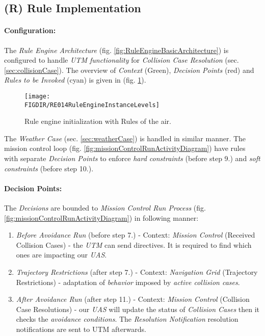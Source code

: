 \subsection{(R) Rule Implementation}\label{sec:ruleImplementation}

\paragraph{Configuration:} The \emph{Rule Engine Architecture} (fig. \ref{fig:RuleEngineBasicArchitecture}) is configured to handle \emph{UTM functionality} for \emph{Collision Case Resolution} (sec. \ref{sec:collisionCase}).  The overview of \emph{Context} (Green), \emph{Decision Points} (red) and \emph{Rules to be Invoked} (cyan) is given in (fig. \ref{fig:RuleEngineInstanceLevels}). 

\begin{figure}[H]
    \centering
    \texttt{[image: \\FIGDIR/RE014RuleEngineInstanceLevels]} 
    \caption{Rule engine initialization with Rules of the air.}
    \label{fig:RuleEngineInstanceLevels}
\end{figure}

\begin{note}
    The \emph{Weather Case} (sec. \ref{sec:weatherCase}) is handled in similar manner. The mission control loop (fig. \ref{fig:missionControlRunActivityDiagram}) have rules with separate \emph{Decision Points} to enforce \emph{hard constraints} (before step 9.) and \emph{soft constraints} (before step 10.).
\end{note}


\paragraph{Decision Points:} The \emph{Decisions} are bounded to \emph{Mission Control Run Process} (fig. \ref{fig:missionControlRunActivityDiagram}) in following manner:
\begin{enumerate}
    \item \emph{Before Avoidance Run} (before step 7.) - Context: \emph{Mission Control} (Received Collision Cases) - the \emph{UTM} can send  directives. It is required to find which ones are impacting our \emph{UAS}.
    
    \item \emph{Trajectory Restrictions} (after step 7.) - Context: \emph{Navigation Grid} (Trajectory Restrictions) - adaptation of \emph{behavior} imposed by \emph{active collision cases}.
    
    \item \emph{After Avoidance Run} (after step 11.) - Context: \emph{Mission Control} (Collision Case Resolutions) - our \emph{UAS} will update the status of \emph{Collision Cases} then it checks the \emph{avoidance conditions}. The \emph{Resolution Notification} resolution notifications are sent to UTM afterwards.
    
\end{enumerate}

